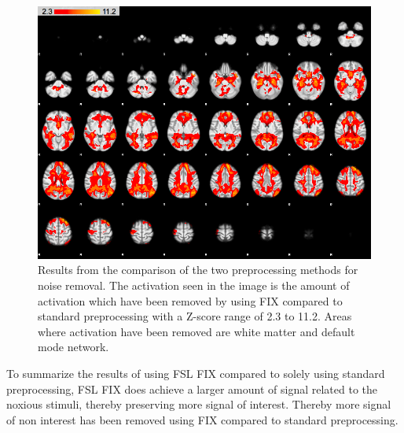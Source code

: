 \begin{figure}[H]                 
	\includegraphics[width=.65\textwidth]{figures/Results/diff_neg}  
	\caption{Results from the comparison of the two preprocessing methods for noise removal. The activation seen in the image is the amount of activation which have been removed by using FIX compared to standard preprocessing with a Z-score range of 2.3 to 11.2. Areas where activation have been removed are white matter and default mode network.}
	\label{fig:res:diff_neg} 
\end{figure}

To summarize the results of using FSL FIX compared to solely using standard preprocessing, FSL FIX does achieve a larger amount of signal related to the noxious stimuli, thereby preserving more signal of interest. Thereby more signal of non interest has been removed using FIX compared to standard preprocessing. 

